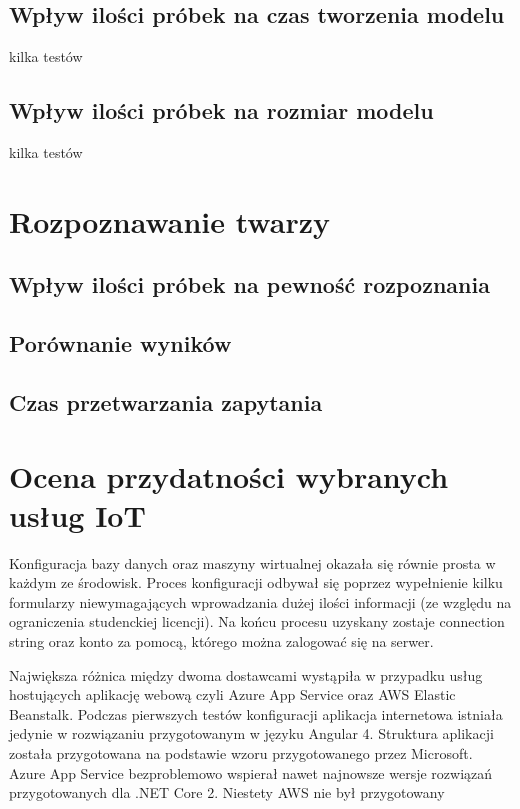 \subsection{Wpływ ilości próbek na czas tworzenia modelu}
kilka testów
\subsection{Wpływ ilości próbek na rozmiar modelu}
kilka testów

\section{Rozpoznawanie twarzy} \label{b:rozpoznawanie}
\subsection{Wpływ ilości próbek na pewność rozpoznania}

\subsection{Porównanie wyników}
\subsection{Czas przetwarzania zapytania}

\section{Ocena przydatności wybranych usług IoT}



Konfiguracja bazy danych oraz maszyny wirtualnej okazała się równie prosta w każdym ze środowisk. Proces konfiguracji odbywał się poprzez wypełnienie kilku formularzy niewymagających wprowadzania dużej ilości informacji (ze względu na ograniczenia studenckiej licencji). Na końcu procesu uzyskany zostaje connection string oraz konto za pomocą, którego można zalogować się na serwer.

Największa różnica między dwoma dostawcami wystąpiła w przypadku usług hostujących aplikację webową czyli Azure App Service oraz AWS Elastic Beanstalk. Podczas pierwszych testów konfiguracji aplikacja internetowa istniała jedynie w rozwiązaniu przygotowanym w języku Angular 4. Struktura aplikacji została przygotowana na podstawie wzoru przygotowanego przez Microsoft. Azure App Service bezproblemowo wspierał nawet najnowsze wersje rozwiązań przygotowanych dla .NET Core 2. Niestety AWS nie był przygotowany 